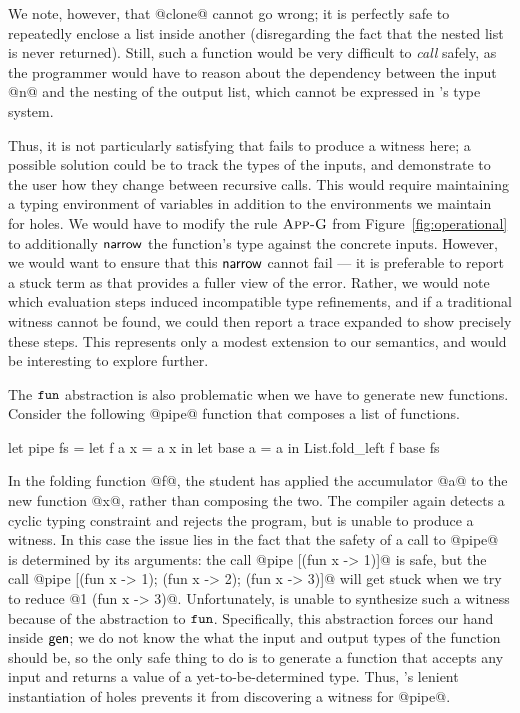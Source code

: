 We note, however, that @clone@ cannot go wrong; it is perfectly safe to
repeatedly enclose a list inside another (disregarding the fact that the
nested list is never returned).
%
Still, such a function would be very difficult to \emph{call} safely, as
the programmer would have to reason about the dependency between the
input @n@ and the nesting of the output list, which cannot be expressed
in \ocaml's type system.

Thus, it is not particularly satisfying that \toolname fails to produce
a witness here; a possible solution could be to track the types of the
inputs, and demonstrate to the user how they change between recursive
calls.
%
This would require maintaining a typing environment of variables in
addition to the environments we maintain for holes.
%
We would have to modify the rule $\textsc{App-G}$ from
Figure~\ref{fig:operational} to additionally $\mathsf{narrow}$ the function's
type against the concrete inputs.
%
However, we would want to ensure that this $\mathsf{narrow}$ cannot fail ---
it is preferable to report a stuck term as that provides a fuller view
of the error.
%
Rather, we would note which evaluation steps induced incompatible
type refinements, and if a traditional witness cannot be found, we could
then report a trace expanded to show precisely these steps.
%
This represents only a modest extension to our semantics, and would be
interesting to explore further.

The $\mathtt{fun}$ abstraction is also problematic when we have to generate new
functions. Consider the following @pipe@ function that composes a list
of functions.
%
\begin{code}
  let pipe fs =
    let f a x = a x in
    let base a = a in
    List.fold_left f base fs
\end{code}
%
In the folding function @f@, the student has applied the accumulator @a@
to the new function @x@, rather than composing the two.
%
The \ocaml compiler again detects a cyclic typing constraint and rejects
the program, but \toolname is unable to produce a witness.
%
In this case the issue lies in the fact that the safety of a call to
@pipe@ is determined by its arguments: the call @pipe [(fun x -> 1)]@ is
safe, but the call @pipe [(fun x -> 1); (fun x -> 2); (fun x -> 3)]@
will get stuck when we try to reduce @1 (fun x -> 3)@.
%
Unfortunately, \toolname is unable to synthesize such a witness because
of the abstraction to $\mathtt{fun}$.
%
Specifically, this abstraction forces our hand inside $\mathsf{gen}$; we do
not know the what the input and output types of the function should be,
so the only safe thing to do is to generate a function that accepts any
input and returns a value of a yet-to-be-determined type.
%
Thus, \toolname's lenient instantiation of holes prevents it from
discovering a witness for @pipe@.


